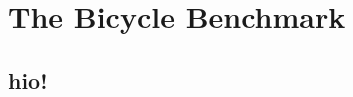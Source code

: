 \chapter{The Bicycle Benchmark}
\label{cha:the_bicycle_benchmark}

\section{hio!}
\label{sec:hio_}
\blindtext
\blindtext

\blindtext
